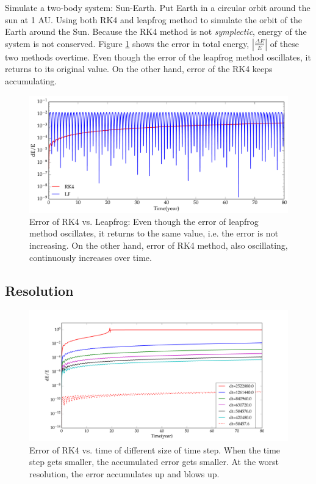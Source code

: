 \documentclass[11pt,letterpaper]{article}
\begin{document}
Simulate a two-body system: Sun-Earth. Put Earth in a circular orbit around the sun at 1 AU. Using both RK4 and leapfrog method to simulate the orbit of the Earth around the Sun. Because the RK4 method is not \emph{symplectic}, energy of the system is not conserved. Figure \ref{fig:AddedError} shows the error in total energy, $\left | \frac{\Delta E}{E} \right |$ of these two methods overtime. Even though the error of the leapfrog method oscillates, it returns to its original value. On the other hand, error of the RK4 keeps accumulating.

\begin{figure}[h!]
	\centering
	\includegraphics[height = 0.3\textheight]{AddedError}
	\caption{Error of RK4 vs. Leapfrog: Even though the error of leapfrog method oscillates, it returns to the same value, i.e. the error is not increasing. On the other hand, error of RK4 method, also oscillating, continuously increases over time.}
	\label{fig:AddedError}
\end{figure}

\subsection{Resolution}

\begin{figure}[h!]
	\centering
	\includegraphics[height = 0.4\textheight]{Resolution}
	\caption{Error of RK4 vs. time of different size of time step. When the time step gets smaller, the accumulated error gets smaller. At the worst resolution, the error accumulates up and blows up.}
	\label{fig:Resolution}
\end{figure}
\end{document}
